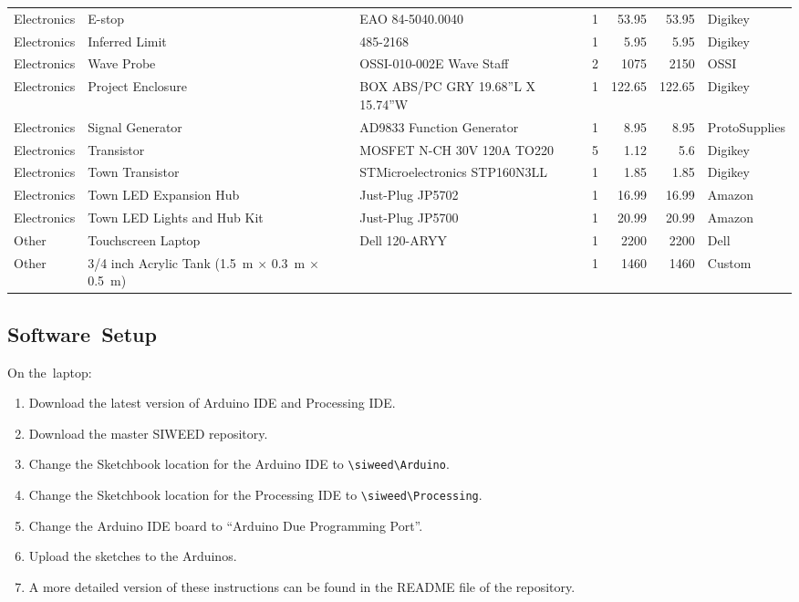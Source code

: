 \documentclass[hardware,article,submit,pdftex,moreauthors]{Definitions/mdpi}
\begin{document}
\begin{table}[H]
\begin{tabularx}{\textwidth}{llLrrrl}
Electronics & E-stop  & EAO 84-5040.0040  & 1 & 53.95 & 53.95 & Digikey \\
Electronics & Inferred Limit  & 485-2168  & 1 & 5.95  & 5.95  & Digikey \\
Electronics & Wave Probe  & OSSI-010-002E Wave Staff  & 2 & 1075  & 2150  & OSSI  \\
Electronics & Project Enclosure & BOX ABS/PC GRY 19.68''L X 15.74''W  & 1 & 122.65  & 122.65  & Digikey \\
Electronics & Signal Generator  & AD9833 Function Generator   & 1 & 8.95  & 8.95  & ProtoSupplies \\
Electronics & Transistor  & MOSFET N-CH 30V 120A TO220  & 5 & 1.12  & 5.6 & Digikey \\
Electronics & Town Transistor & STMicroelectronics STP160N3LL & 1 & 1.85  & 1.85  & Digikey \\
Electronics & Town LED Expansion Hub  & Just-Plug JP5702  & 1 & 16.99 & 16.99 & Amazon  \\
Electronics & Town LED Lights and Hub Kit & Just-Plug JP5700  & 1 & 20.99 & 20.99 & Amazon  \\
Other & Touchscreen Laptop  & Dell 120-ARYY & 1 & 2200  & 2200  & Dell  \\
Other & 3/4 inch Acrylic Tank (1.5~m $\times$ 0.3~m $\times$ 0.5~m) &   & 1 & 1460  & 1460  & Custom  \\
\bottomrule
\end{tabularx}
\end{table}

\finishlandscape


\subsection{Software~Setup}
On the~laptop:
\begin{enumerate}
\item Download the latest version of Arduino IDE and Processing IDE. %
\item Download the master SIWEED repository.
\item Change the Sketchbook location for the Arduino IDE to \texttt{\textbackslash siweed\textbackslash Arduino}.
\item Change the Sketchbook location for the Processing IDE to \texttt{\textbackslash siweed\textbackslash Processing}.
\item Change the Arduino IDE board to ``Arduino Due Programming Port''.
\item Upload the sketches to the Arduinos.
\item A more detailed version of these instructions can be found in the README file of the repository.
\end{enumerate}
\end{document}
